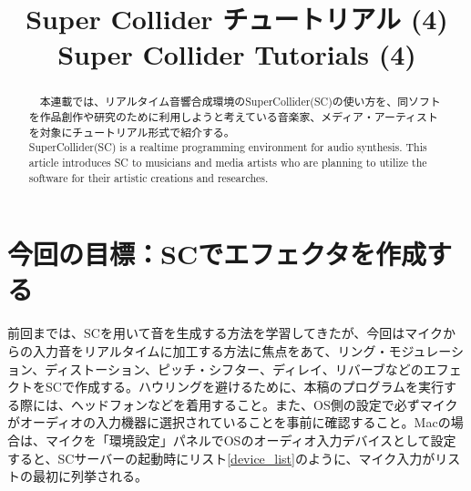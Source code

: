 \documentclass{jsarticle}
\title{Super Collider チュートリアル (4)\\ 
Super Collider Tutorials (4)
}
\begin{document}
\makeatletter 
\def\ps@myheadings{%
\let\ps@jpl@in\ps@plain%
\def\@evenhead{\reset@font\hfil\leftmark\hfil}%
\def\@oddhead{\reset@font\hfil\rightmark\hfil}%
\let\@mkboth\@gobbletwo%
\let\sectionmark\@gobble%
\let\subsectionmark\@gobble%
% 
\def\@oddfoot{\reset@font\hfil-- \thepage --\hfil}%
\let\@evenfoot\@oddfoot 
} 
\makeatother 


\setcounter{page}{ 3 } 
\pagestyle{myheadings} 




\maketitle
\thispagestyle{myheadings}

%
\begin{abstract}
　本連載では、リアルタイム音響合成環境のSuperCollider(SC)の使い方を、同ソフトを作品創作や研究のために利用しようと考えている音楽家、メディア・アーティストを対象にチュートリアル形式で紹介する。\\
SuperCollider(SC) is a realtime programming environment for audio synthesis. This article introduces SC to musicians and media artists who are planning to utilize the software for their artistic creations and researches.

\end{abstract}
%
\section{今回の目標：SCでエフェクタを作成する}
前回までは、SCを用いて音を生成する方法を学習してきたが、今回はマイクからの入力音をリアルタイムに加工する方法に焦点をあて、リング・モジュレーション、ディストーション、ピッチ・シフター、ディレイ、リバーブなどのエフェクトをSCで作成する。ハウリングを避けるために、本稿のプログラムを実行する際には、ヘッドフォンなどを着用すること。また、OS側の設定で必ずマイクがオーディオの入力機器に選択されていることを事前に確認すること。Macの場合は、マイクを「環境設定」パネルでOSのオーディオ入力デバイスとして設定すると、SCサーバーの起動時にリスト\ref{device_list}のように、マイク入力がリストの最初に列挙される。
\end{document}
